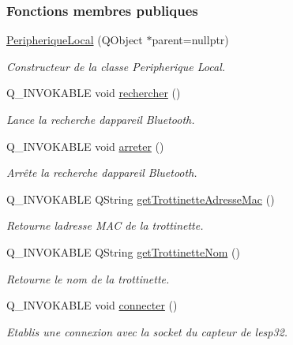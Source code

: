 \subsubsection*{Fonctions membres publiques}
\begin{DoxyCompactItemize}
\item 
\hyperlink{class_peripherique_local_a99a652b8659a3692f164cf1a0382e4bf}{Peripherique\+Local} (Q\+Object $\ast$parent=nullptr)
\begin{DoxyCompactList}\small\item\em Constructeur de la classe Peripherique Local. \end{DoxyCompactList}\item 
Q\+\_\+\+I\+N\+V\+O\+K\+A\+B\+LE void \hyperlink{class_peripherique_local_aa3b12b1c122605cf00b8ab48ed4284c1}{rechercher} ()
\begin{DoxyCompactList}\small\item\em Lance la recherche d\textquotesingle{}appareil Bluetooth. \end{DoxyCompactList}\item 
Q\+\_\+\+I\+N\+V\+O\+K\+A\+B\+LE void \hyperlink{class_peripherique_local_afbbb6d37b616cc4579486c3b1ce700b2}{arreter} ()
\begin{DoxyCompactList}\small\item\em Arrête la recherche d\textquotesingle{}appareil Bluetooth. \end{DoxyCompactList}\item 
Q\+\_\+\+I\+N\+V\+O\+K\+A\+B\+LE Q\+String \hyperlink{class_peripherique_local_a465658a204541e309f2647d473f658d8}{get\+Trottinette\+Adresse\+Mac} ()
\begin{DoxyCompactList}\small\item\em Retourne l\textquotesingle{}adresse M\+AC de la trottinette. \end{DoxyCompactList}\item 
Q\+\_\+\+I\+N\+V\+O\+K\+A\+B\+LE Q\+String \hyperlink{class_peripherique_local_ac81a942b4d1d9e848649073c53ed6917}{get\+Trottinette\+Nom} ()
\begin{DoxyCompactList}\small\item\em Retourne le nom de la trottinette. \end{DoxyCompactList}\item 
Q\+\_\+\+I\+N\+V\+O\+K\+A\+B\+LE void \hyperlink{class_peripherique_local_af2e7f023f8ed72ebc1d36e66c440ceca}{connecter} ()
\begin{DoxyCompactList}\small\item\em Etablis une connexion avec la socket du capteur de l\textquotesingle{}esp32. \end{DoxyCompactList}\item 

\end{DoxyCompactItemize}
